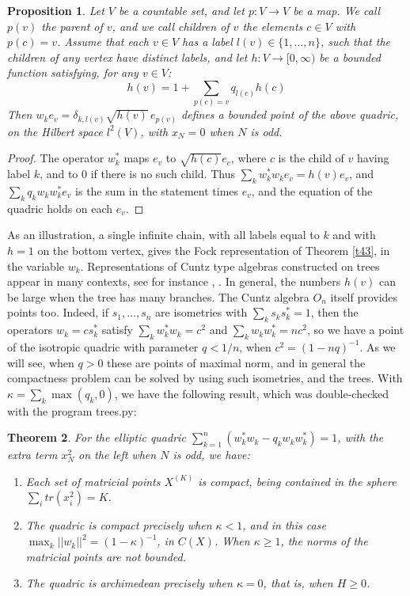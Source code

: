 \documentclass[11pt]{amsart}
\newtheorem{theorem}{Theorem}[section]
\newtheorem{proposition}[theorem]{Proposition}
\theoremstyle{definition}
\begin{document}
\begin{proposition}\label{p52}
Let $V$ be a countable set, and let $p:V\to V$ be a map. We call $p(v)$ the parent of $v$, and we call children of $v$ the elements $c\in V$ with $p(c)=v$. Assume that each $v\in V$ has a label $l(v)\in\{1,\ldots,n\}$, such that the children of any vertex have distinct labels, and let $h:V\to[0,\infty)$ be a bounded function satisfying, for any $v\in V$:
$$h(v)=1+\sum_{p(c)=v}q_{l(c)}h(c)$$
Then $w_ke_v=\delta_{k,l(v)}\sqrt{h(v)}\,e_{p(v)}$ defines a bounded point of the above quadric, on the Hilbert space $l^2(V)$, with $x_N=0$ when $N$ is odd.
\end{proposition}

\begin{proof}
The operator $w_k^*$ maps $e_v$ to $\sqrt{h(c)}e_c$, where $c$ is the child of $v$ having label $k$, and to 0 if there is no such child. Thus $\sum_kw_k^*w_ke_v=h(v)e_v$, and $\sum_kq_kw_kw_k^*e_v$ is the sum in the statement times $e_v$, and the equation of the quadric holds on each $e_v$.
\end{proof}

As an illustration, a single infinite chain, with all labels equal to $k$ and with $h=1$ on the bottom vertex, gives the Fock representation of Theorem \ref{t43}, in the variable $w_k$. Representations of Cuntz type algebras constructed on trees appear in many contexts, see for instance \cite{cmr}, \cite{mpa}. In general, the numbers $h(v)$ can be large when the tree has many branches. The Cuntz algebra $O_n$ itself provides points too. Indeed, if $s_1,\ldots,s_n$ are isometries with $\sum_ks_ks_k^*=1$, then the operators $w_k=cs_k^*$ satisfy $\sum_kw_k^*w_k=c^2$ and $\sum_kw_kw_k^*=nc^2$, so we have a point of the isotropic quadric with parameter $q<1/n$, when $c^2=(1-nq)^{-1}$. As we will see, when $q>0$ these are points of maximal norm, and in general the compactness problem can be solved by using such isometries, and the trees. With $\kappa=\sum_k\max(q_k,0)$, we have the following result, which was double-checked with the program trees.py:

\begin{theorem}\label{t53}
For the elliptic quadric $\sum_{k=1}^n(w_k^*w_k-q_kw_kw_k^*)=1$, with the extra term $x_N^2$ on the left when $N$ is odd, we have:
\begin{enumerate}
\item Each set of matricial points $X^{(K)}$ is compact, being contained in the sphere $\sum_itr(x_i^2)=K$.

\item The quadric is compact precisely when $\kappa<1$, and in this case $\max_k||w_k||^2=(1-\kappa)^{-1}$, in $C(X)$. When $\kappa\geq1$, the norms of the matricial points are not bounded.

\item The quadric is archimedean precisely when $\kappa=0$, that is, when $H\geq0$.
\end{enumerate}
\end{theorem}
\end{document}
